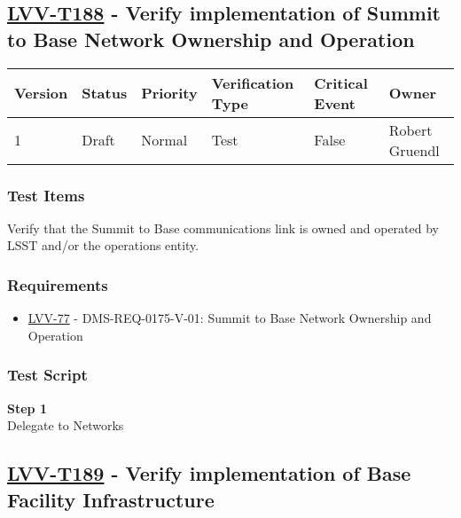 \hypertarget{lvv-t188---verify-implementation-of-summit-to-base-network-ownership-and-operation}{\subsection{\texorpdfstring{\href{https://jira.lsstcorp.org/secure/Tests.jspa\#/testCase/LVV-T188}{LVV-T188}
- Verify implementation of Summit to Base Network Ownership and
Operation}{LVV-T188 - Verify implementation of Summit to Base Network Ownership and Operation}}\label{lvv-t188---verify-implementation-of-summit-to-base-network-ownership-and-operation}}

\begin{longtable}[]{@{}llllll@{}}
\toprule
Version & Status & Priority & Verification Type & Critical Event &
Owner\tabularnewline
\midrule
\endhead
1 & Draft & Normal & Test & False & Robert Gruendl\tabularnewline
\bottomrule
\end{longtable}

\subsubsection{Test Items}\label{test-items-47}

Verify that the Summit to Base communications link is owned and operated
by LSST and/or the operations entity.

\subsubsection{Requirements}\label{requirements-47}

\begin{itemize}
\tightlist
\item
  \href{https://jira.lsstcorp.org/browse/LVV-77}{LVV-77} -
  DMS-REQ-0175-V-01: Summit to Base Network Ownership and Operation
\end{itemize}

\subsubsection{Test Script}\label{test-script-47}

\textbf{Step 1}\\
Delegate to Networks\\[2\baselineskip]

\hypertarget{lvv-t189---verify-implementation-of-base-facility-infrastructure}{\subsection{\texorpdfstring{\href{https://jira.lsstcorp.org/secure/Tests.jspa\#/testCase/LVV-T189}{LVV-T189}
- Verify implementation of Base Facility
Infrastructure}{LVV-T189 - Verify implementation of Base Facility Infrastructure}}\label{lvv-t189---verify-implementation-of-base-facility-infrastructure}}

